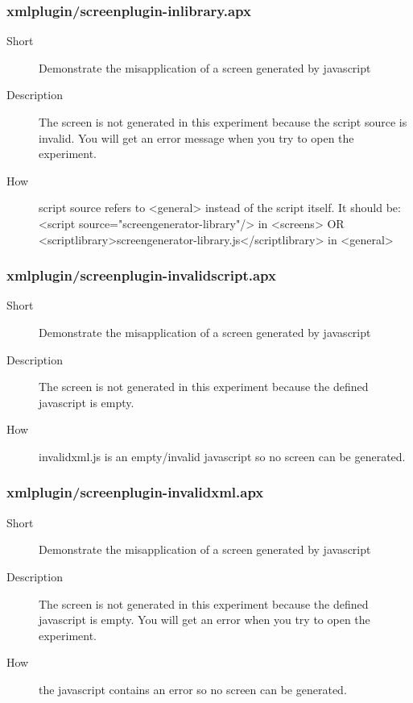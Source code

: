 \subsubsection{xmlplugin/screenplugin-inlibrary.apx}
\begin{description}
\item[Short] 
 Demonstrate the misapplication of a screen generated by javascript
\item[Description] 
 The screen is not generated in this experiment because the script source is invalid. You will get an error message when you try to open the experiment.
\item[How] 
 script source refers to \textless{}general\textgreater{} instead of the script itself. It should be: \textless{}script source="screengenerator-library"/\textgreater{} in \textless{}screens\textgreater{} OR \textless{}scriptlibrary\textgreater{}screengenerator-library.js\textless{}/scriptlibrary\textgreater{} in \textless{}general\textgreater{}
\end{description}

\subsubsection{xmlplugin/screenplugin-invalidscript.apx}
\begin{description}
\item[Short] 
 Demonstrate the misapplication of a screen generated by  javascript
\item[Description] 
 The screen is not generated in this experiment because the defined javascript is empty.
\item[How] 
 invalidxml.js is an empty/invalid javascript so no screen can be generated.
\end{description}

\subsubsection{xmlplugin/screenplugin-invalidxml.apx}
\begin{description}
\item[Short] 
 Demonstrate the misapplication of a screen generated by javascript
\item[Description] 
 The screen is not generated in this experiment because the defined javascript is empty. You will get an error when you try to open the experiment.
\item[How] 
 the javascript contains an error so no screen can be generated.
\end{description}

